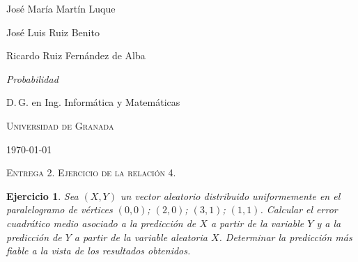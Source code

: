 \documentclass[
  a4paper,
  spanish,
  12pt,
]{scrartcl}
\theoremstyle{ejercicio-style}
\newtheorem{ejer}{Ejercicio}
\theoremstyle{remark-style}
\begin{document}
\begin{flushright}
  José María Martín Luque
  
  José Luis Ruiz Benito

  Ricardo Ruiz Fernández de Alba
  \vspace{.5em}

  \textit{Probabilidad}

  D.\,G. en Ing. Informática y Matemáticas

  \textsc{Universidad de Granada}\vspace{.5em}

  \today\vspace{.5em}
\end{flushright}

\begin{flushleft}
  \scshape\Large Entrega 2. Ejercicio de la relación 4.
\end{flushleft}

\setcounter{ejer}{13}

\begin{ejer}
  Sea \((X, Y)\) un vector aleatorio distribuido uniformemente en el paralelogramo de vértices \((0,0)\); \((2,0)\); \((3,1)\); \((1,1)\). Calcular el error cuadrático medio asociado a la predicción de \(X\) a partir de la variable \(Y\) y a la predicción de \(Y\) a partir de la variable aleatoria \(X\). Determinar la predicción más fiable a la vista de los resultados obtenidos.
\end{ejer}
\end{document}
